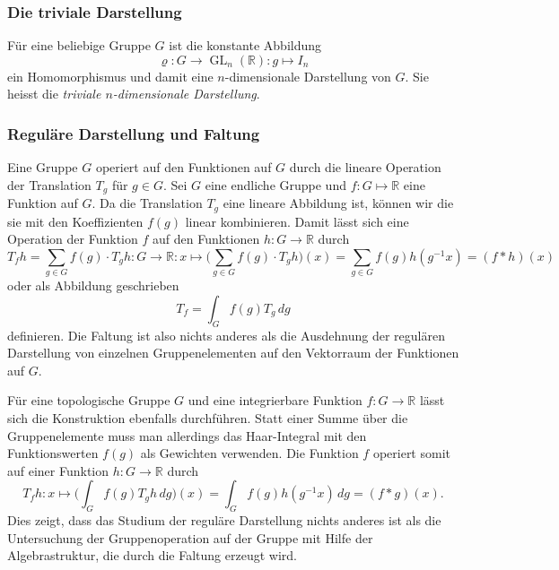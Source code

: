 %
%
\subsubsection{Die triviale Darstellung}
Für eine beliebige Gruppe $G$ ist die konstante Abbildung
\[
\varrho
\colon
G\to \operatorname{GL}_n(\mathbb{R})
:
g\mapsto I_n
\]
ein Homomorphismus und damit eine $n$-dimensionale Darstellung von $G$.
Sie heisst die {\em triviale $n$-dimensionale Darstellung}.
%
%

%
%
\subsubsection{Reguläre Darstellung und Faltung}
Eine Gruppe $G$ operiert auf den Funktionen auf $G$ durch die 
lineare Operation der Translation $T_g$ für $g\in G$.
Sei $G$ eine endliche Gruppe und $f\colon G\mapsto \mathbb{R}$ eine
Funktion auf $G$.
Da die Translation $T_g$ eine lineare Abbildung ist, können wir die 
sie mit den Koeffizienten $f(g)$ linear kombinieren.
Damit lässt sich eine Operation der Funktion $f$ auf den Funktionen
$h\colon G\to\mathbb{R}$ durch
\[
T_fh
=
\sum_{g\in G} f(g)\cdot T_gh
\colon
G\to\mathbb{R}
:
x\mapsto
\biggl( \sum_{g\in G} f(g)\cdot T_gh\biggr) (x)
=
\sum_{g\in G} f(g)h(g^{-1}x)
=
(f*h)(x)
\]
oder als Abbildung geschrieben
\[
T_f
=
\int_G f(g)T_g\,dg
\]
definieren.
Die Faltung ist also nichts anderes als die Ausdehnung der regulären
Darstellung von einzelnen Gruppenelementen auf den Vektorraum
der Funktionen auf $G$.

Für eine topologische Gruppe $G$ und eine integrierbare Funktion
$f\colon G\to\mathbb{R}$
lässt sich die Konstruktion ebenfalls durchführen.
Statt einer Summe über die Gruppenelemente muss man allerdings das
Haar-Integral mit den Funktionswerten $f(g)$ als Gewichten verwenden.
Die Funktion $f$ operiert somit auf einer Funktion $h\colon G\to\mathbb{R}$
durch 
\[
T_fh\colon
x\mapsto
\biggl(\int_G f(g) T_gh\,dg\biggr)(x)
=
\int_G f(g) h(g^{-1}x)\,dg
=
(f*g)(x).
\]
Dies zeigt, dass das Studium der reguläre Darstellung nichts anderes
ist als die Untersuchung der Gruppenoperation auf der Gruppe mit Hilfe
der Algebrastruktur, die durch die Faltung erzeugt wird.

